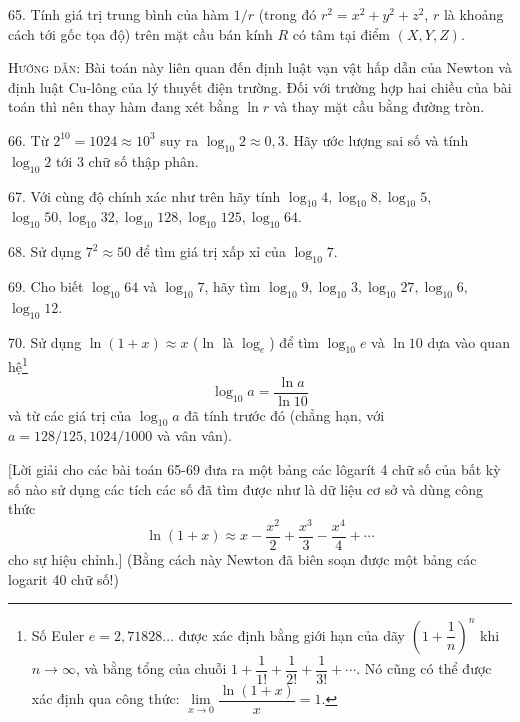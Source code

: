 \begin{problem}{65.}
	Tính giá trị trung bình của hàm $1/r$ (trong đó $r^2=x^2+y^2+z^2$, $r$ là khoảng cách tới gốc tọa độ) trên mặt cầu bán kính $R$ có tâm tại điểm $(X,Y,Z)$.

	\textsc{Hướng dẫn}: Bài toán này liên quan đến định luật vạn vật hấp dẫn của Newton và định luật Cu-lông của lý thuyết điện trường. Đối với trường hợp hai chiều của bài toán thì nên thay hàm đang xét bằng $\ln r$ và thay mặt cầu bằng đường tròn.
\end{problem}

\begin{problem}{66.}
	Từ $2^{10}=1024\approx 10^3$ suy ra $\log_{10}2\approx 0,3$. Hãy ước lượng sai số và tính $\log_{10}2$ tới 3 chữ số thập phân.
\end{problem}

\begin{problem}{67.}
	Với cùng độ chính xác như trên hãy tính $\log_{10}4, \log_{10}8, \log_{10}5,$ $ \log_{10}50, \log_{10}32, \log_{10}128, \log_{10}125, \log_{10}64.$
\end{problem}

\begin{problem}{68.}
	Sử dụng $7^2\approx 50$ để tìm giá trị xấp xỉ của $\log_{10}7$. 
\end{problem}

\begin{problem}{69.}
	Cho biết $\log_{10}64$ và $\log_{10}7$, hãy tìm $\log_{10}9, \log_{10}3, \log_{10}27, \log_{10}6,$ $ \log_{10}12$.
\end{problem}

\begin{problem}{70.}
	Sử dụng $\ln(1+x)\approx x$ ($\ln$ là $\log_e$) để tìm $\log_{10}e$ và $\ln 10$ dựa vào quan hệ\footnote{Số Euler $e=2,71828\ldots$ được xác định bằng giới hạn của dãy $\left(1+\dfrac{1}{n}\right)^n$ khi $n\rightarrow \infty$, và bằng tổng của chuỗi $1+\dfrac{1}{1!}+\dfrac{1}{2!}+\dfrac{1}{3!}+\cdots$. Nó cũng có thể được xác định qua công thức: $\lim\limits_{x\rightarrow 0}\dfrac{\ln(1+x)}{x}=1$.}
	$$\log_{10}a=\dfrac{\ln a}{\ln 10}$$
	và từ các giá trị của $\log_{10}a$ đã tính trước đó (chẳng hạn, với $a=128/125, 1024/1000$ và vân vân).

	[Lời giải cho các bài toán 65-69 đưa ra một bảng các lôgarít 4 chữ số của bất kỳ số nào sử dụng các tích các số đã tìm được như là dữ liệu cơ sở và dùng công thức $$\ln(1+x)\approx x-\dfrac{x^2}{2}+\dfrac{x^3}{3}-\dfrac{x^4}{4}+\cdots$$ cho sự hiệu chỉnh.] (Bằng cách này Newton đã biên soạn được một bảng các logarit 40 chữ số!)
\end{problem}

